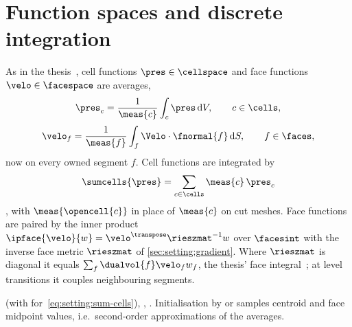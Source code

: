 \section{Function spaces and discrete integration}\label{sec:setting:spaces}
As in the thesis~, cell functions $\pres\in\cellspace$ and
face functions $\velo\in\facespace$ are averages,
\begin{equation}\label{eq:setting:cell-average}
  \pres_c=\frac{1}{\meas{c}}\integral{c}{\pres}{V},\qquad c\in\cells,
\end{equation}
\begin{equation}\label{eq:setting:face-average}
  \velo_f=\frac{1}{\meas{f}}\integral{f}{\Velo\cdot\fnormal{f}}{S},\qquad f\in\faces,
\end{equation}
now on every owned segment $f$. Cell functions are integrated by
\begin{equation}\label{eq:setting:sum-cells}
  \sumcells{\pres}=\sum_{c\in\cells}\meas{c}\,\pres_c
\end{equation}
, with $\meas{\opencell{c}}$ in place of $\meas{c}$ on cut
meshes. Face functions are paired by the inner product
$\ipface{\velo}{w}=\velo^{\transpose}\rieszmat^{-1}w$ over $\facesint$ with the
inverse face metric $\rieszmat$ of \cref{sec:setting:gradient}. Where
$\rieszmat$ is diagonal it equals $\sum_{f}\dualvol{f}\velo_f w_f$, the
thesis' face integral~; at level transitions it couples
neighbouring segments.

\begin{implnote}
 (with  for~\cref{eq:setting:sum-cells}),
, . Initialisation by
 or  samples centroid and face
midpoint values, i.e.\ second-order approximations of the averages.
\end{implnote}

